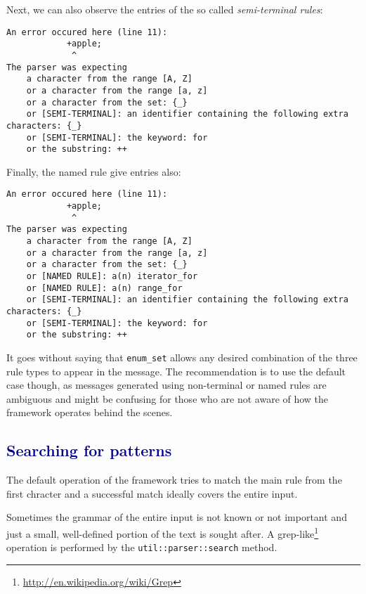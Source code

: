 \documentclass[12pt]{article}
\newcommand{\usubsec}[2]{\subsection*{\textcolor{darkblue}{#1}}\label{subsec:#2}\addcontentsline{toc}{subsection}{#1}}
\begin{document}
Next, we can also observe the entries of the so called \emph{semi-terminal rules}:
\begin{center}
	\begin{minipage}[ht]{0.8\textwidth}
		\begin{lstlisting}[breaklines=true]
An error occured here (line 11):
			+apple;
			 ^
The parser was expecting
	a character from the range [A, Z]
	or a character from the range [a, z]
	or a character from the set: {_}
	or [SEMI-TERMINAL]: an identifier containing the following extra characters: {_}
	or [SEMI-TERMINAL]: the keyword: for
	or the substring: ++
		\end{lstlisting}
	\end{minipage}
\end{center}

Finally, the named rule give entries also:
\begin{center}
	\begin{minipage}[ht]{0.8\textwidth}
		\begin{lstlisting}[breaklines=true]
An error occured here (line 11):
			+apple;
			 ^
The parser was expecting
	a character from the range [A, Z]
	or a character from the range [a, z]
	or a character from the set: {_}
	or [NAMED RULE]: a(n) iterator_for
	or [NAMED RULE]: a(n) range_for
	or [SEMI-TERMINAL]: an identifier containing the following extra characters: {_}
	or [SEMI-TERMINAL]: the keyword: for
	or the substring: ++
		\end{lstlisting}
	\end{minipage}
\end{center}

It goes without saying that \texttt{enum\_set} allows any desired combination of the three rule types to
appear in the message. The recommendation is to use the default case though, as messages generated using
non-terminal or named rules are ambiguous and might be confusing for those who are not aware of how the
framework operates behind the scenes.

\usubsec{Searching for patterns}{search}
The default operation of the framework tries to match the main rule from the first chracter and a successful
match ideally covers the entire input.

Sometimes the grammar of the entire input is not known or not important and just a small, well-defined portion
of the text is sought after. A
grep-like\footnote{\href{http://en.wikipedia.org/wiki/Grep}{http://en.wikipedia.org/wiki/Grep}} operation is
performed by the \texttt{util::parser::search} method.
\end{document}
